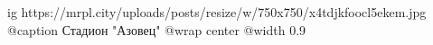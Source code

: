  
 
 
 
 

\ifcmt
  ig https://mrpl.city/uploads/posts/resize/w/750x750/x4tdjkfoocl5ekem.jpg
	@caption Стадион "Азовец"
  @wrap center
  @width 0.9
\fi
